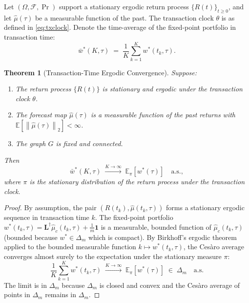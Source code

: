 \documentclass[twocolumn,11pt,a4paper]{article}
\theoremstyle{plain}
\newtheorem{theorem}{Theorem}[section]
\theoremstyle{definition}
\theoremstyle{remark}
\newcommand{\E}{\mathbb{E}}
\newcommand{\F}{\mathcal{F}}
\newcommand{\Lpinv}{\mathbf{L}^{\dagger}} %
\newcommand{\wstar}{w^{*}}
\newcommand{\Deltam}{\Delta_m}
\newcommand{\norm}[1]{\left\|#1\right\|}
\newcommand{\one}{\mathbf{1}}
\begin{document}
Let $(\Omega,\F,\Pr)$ support a stationary ergodic return process
$\{R(t)\}_{t\ge 0}$, and let $\hat\mu(\tau)$ be a measurable function
of the past.  The transaction clock $\theta$ is as defined in
\eqref{eq:txclock}.  Denote the time-average of the fixed-point
portfolio in transaction time:
\begin{equation}
  \bar w^*(K,\tau) \;=\; \frac{1}{K}\sum_{k=1}^K \wstar(t_k,\tau).
  \label{eq:time_avg}
\end{equation}

\begin{theorem}[Transaction-Time Ergodic Convergence]
  \label{thm:ergodic}
  Suppose:
  \begin{enumerate}[label=(\roman*)]
    \item The return process $\{R(t)\}$ is stationary and ergodic
          under the transaction clock $\theta$.
    \item The forecast map $\hat\mu(\tau)$ is a measurable function
          of the past returns with $\E[\norm{\hat\mu(\tau)}_2]<\infty$.
    \item The graph $G$ is fixed and connected.
  \end{enumerate}
  Then
  \begin{equation}
    \bar w^*(K,\tau) \;\xrightarrow{K\to\infty}\; \E_\pi[\wstar(\tau)]
    \quad\text{a.s.},
    \label{eq:ergodic}
  \end{equation}
  where $\pi$ is the stationary distribution of the return process
  under the transaction clock.
\end{theorem}

\begin{proof}
  By assumption, the pair $(R(t_k),\hat\mu(t_k,\tau))$ forms a
  stationary ergodic sequence in transaction time $k$.  The fixed-point
  portfolio $\wstar(t_k,\tau)=\Lpinv\hat\mu_c(t_k,\tau)+\frac{1}{m}\one$
  is a measurable, bounded function of $\hat\mu_c(t_k,\tau)$ (bounded
  because $\wstar\in\Deltam$ which is compact).  By Birkhoff's ergodic
  theorem \cite{Birkhoff1931} applied to the bounded measurable function
  $k\mapsto\wstar(t_k,\tau)$, the Cesàro average converges almost
  surely to the expectation under the stationary measure $\pi$:
  \[
    \frac{1}{K}\sum_{k=1}^K \wstar(t_k,\tau)
    \;\xrightarrow{K\to\infty}\;
    \E_\pi[\wstar(\tau)] \;\in\;\Deltam \quad\text{a.s.}
  \]
  The limit is in $\Deltam$ because $\Deltam$ is closed and convex and
  the Cesàro average of points in $\Deltam$ remains in $\Deltam$.
\end{proof}
\end{document}
